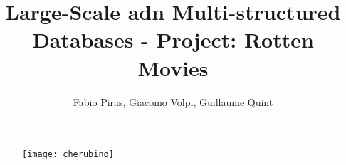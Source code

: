 

\author{Fabio Piras, Giacomo Volpi, Guillaume Quint}
\title{Large-Scale adn Multi-structured Databases - Project: Rotten Movies}
\date{}

\begin{figure}
\centering
\texttt{[image: cherubino]}

\end{figure}

\maketitle


\newpage

\tableofcontents










